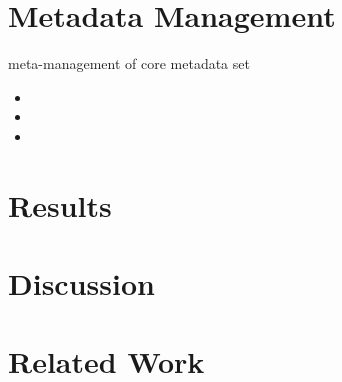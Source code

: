 \documentclass{llncs}
\begin{document}
\subsection{}


\section{Metadata Management}
meta-management of core metadata set

\begin{itemize}
\item 
\item 
\item 
\end{itemize}


\section{Results}




\section{Discussion}

\section{Related Work}

 


\newpage




\end{document}
